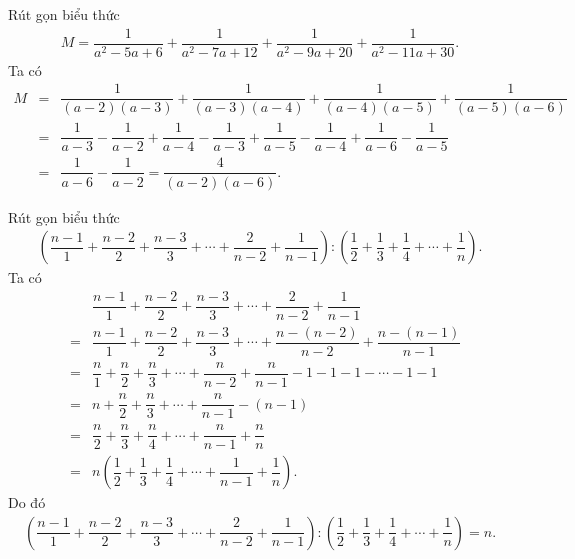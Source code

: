 \begin{bt}%
 Rút gọn biểu thức
 \begin{eqnarray*}
  M = \dfrac{1}{a^2-5a+6} + \dfrac{1}{a^2-7a+12} + \dfrac{1}{a^2-9a+20} + \dfrac{1}{a^2-11a+30}.
 \end{eqnarray*}
 \loigiai
  {
  Ta có
  \allowdisplaybreaks
  \begin{eqnarray*}
   M &=& \dfrac{1}{(a-2)(a-3)} + \dfrac{1}{(a-3)(a-4)} + \dfrac{1}{(a-4)(a-5)} + \dfrac{1}{(a-5)(a-6)}\\
   &=& \dfrac{1}{a-3}-\dfrac{1}{a-2} + \dfrac{1}{a-4}-\dfrac{1}{a-3} + \dfrac{1}{a-5}-\dfrac{1}{a-4} + \dfrac{1}{a-6}-\dfrac{1}{a-5}\\
   &=& \dfrac{1}{a-6}-\dfrac{1}{a-2} = \dfrac{4}{(a-2)(a-6)}.
  \end{eqnarray*}
  }
\end{bt}

\begin{bt}%
 Rút gọn biểu thức
 \begin{eqnarray*}
  \left(\dfrac{n-1}{1} + \dfrac{n-2}{2} + \dfrac{n-3}{3} + \cdots + \dfrac{2}{n-2} + \dfrac{1}{n-1}\right) : \left(\dfrac{1}{2} + \dfrac{1}{3} + \dfrac{1}{4} + \cdots + \dfrac{1}{n}\right).
 \end{eqnarray*}
 \loigiai
  {
  Ta có
  \allowdisplaybreaks
  \begin{eqnarray*}
    & & \dfrac{n-1}{1} + \dfrac{n-2}{2} + \dfrac{n-3}{3} + \cdots + \dfrac{2}{n-2} + \dfrac{1}{n-1}\\
   &=& \dfrac{n-1}{1} + \dfrac{n-2}{2} + \dfrac{n-3}{3} + \cdots + \dfrac{n-(n-2)}{n-2}+\dfrac{n-(n-1)}{n-1}\\
   &=& \dfrac{n}{1} + \dfrac{n}{2} + \dfrac{n}{3} + \cdots + \dfrac{n}{n-2} + \dfrac{n}{n-1} - 1 - 1-1 - \cdots - 1 - 1\\
   &=& n+\dfrac{n}{2}+\dfrac{n}{3}+\cdots + \dfrac{n}{n-1}-(n-1)\\
   &=& \dfrac{n}{2} + \dfrac{n}{3} + \dfrac{n}{4} + \cdots + \dfrac{n}{n-1}+ \dfrac{n}{n}\\
   &=& n\left(\dfrac{1}{2}+\dfrac{1}{3}+\dfrac{1}{4}+\cdots + \dfrac{1}{n-1}+\dfrac{1}{n}\right).
  \end{eqnarray*}
  Do đó
  \begin{eqnarray*}
  	\left(\dfrac{n-1}{1} + \dfrac{n-2}{2} + \dfrac{n-3}{3} + \cdots + \dfrac{2}{n-2} + \dfrac{1}{n-1}\right) : \left(\dfrac{1}{2} + \dfrac{1}{3} + \dfrac{1}{4} + \cdots + \dfrac{1}{n}\right) = n.
  \end{eqnarray*}
  }
\end{bt}

